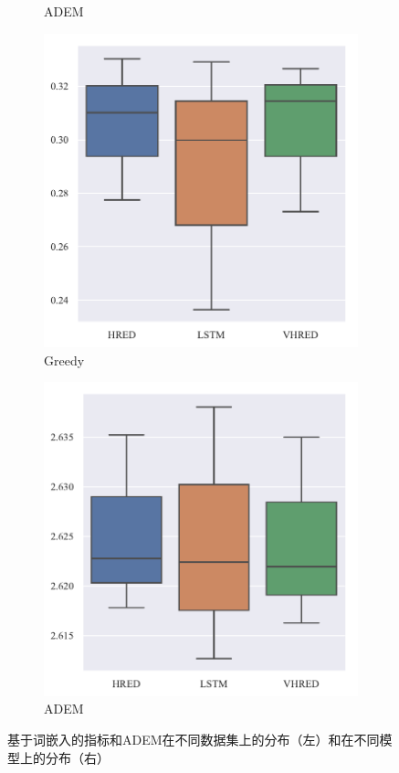 \begin{figure}[H]
\begin{subfigure}{0.24\linewidth}
        \centering
        \caption{ADEM}
        \label{subfig:ADEM_dataset}
    \end{subfigure}%
    \begin{subfigure}{0.24\linewidth}
        \includegraphics[width=\linewidth]{figure/boxplot/model/embedding_based_greedy_matching/plot.pdf}
        \centering
        \caption{Greedy}
    \end{subfigure}%
    \begin{subfigure}{0.24\linewidth}
        \includegraphics[width=\linewidth]{figure/boxplot/model/adem/plot.pdf}
        \centering
        \caption{ADEM}
    \end{subfigure}
    \caption{基于词嵌入的指标和ADEM在不同数据集上的分布（左）和在不同模型上的分布（右）}
    \label{fig:ADEM_EB_dataset}
\end{figure}
